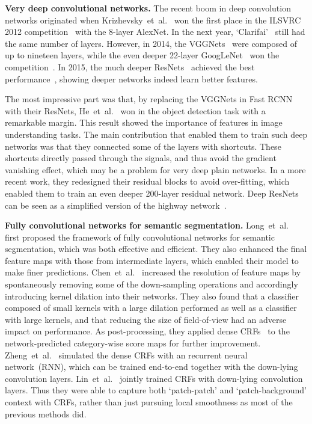 \documentclass{article}
\begin{document}
\textbf{Very deep convolutional networks.}
The recent boom in deep convolution networks originated when Krizhevsky~et~al.~\cite{CNN.NIPS.2012.Krizhevsky} won the first place in the ILSVRC 2012 competition~\cite{ILSVRC2015} with the 8-layer AlexNet.
In the next year, `Clarifai'~\cite{ILSVRC2015} still had the same number of layers.
However, in 2014, the VGGNets~\cite{VGGNet.2014.Simonyan} were composed of up to nineteen layers,
while the even deeper 22-layer GoogLeNet~\cite{GoogLeNet.2014.Szegedy} won the competition~\cite{ILSVRC2015}.
In 2015, the much deeper ResNets~\cite{ResNet.CVPR.2016.He} achieved the best performance~\cite{ILSVRC2015},
showing deeper networks indeed learn better features.

The most impressive part was that, by replacing the VGGNets in Fast RCNN~\cite{FastRCNN.ICCV.2015.Girshick} with their ResNets, He~et~al.~\cite{ResNet.CVPR.2016.He} won in the object detection task with a remarkable margin.
This result showed the importance of features in image understanding tasks.
The main contribution that enabled them to
train such deep networks was that they connected some of the layers with shortcuts.
These shortcuts directly passed through the signals,
and thus avoid the gradient vanishing effect,
which may be a problem for very deep plain networks.
In a more recent work, they redesigned their residual blocks to avoid over-fitting,
which enabled them to train an even deeper 200-layer residual network.
Deep ResNets can be seen as a simplified version of the highway network~\cite{Highway}.



\textbf{Fully convolutional networks for semantic segmentation.}
Long~et~al.~\cite{FCN.CVPR.2015.Long} first proposed the framework of fully convolutional networks for semantic segmentation, which was both effective and efficient.
They also enhanced the final feature maps with those from intermediate layers, which enabled their model to make finer predictions.
Chen~et~al.~\cite{DeepLab.ICLR.2015.Chen} increased the resolution of feature maps by spontaneously
removing some of the down-sampling operations and accordingly introducing kernel dilation into their networks.
They also found that a classifier composed of small kernels with a large dilation performed as well as a classifier
with large kernels, and that reducing the size of field-of-view had an adverse impact on performance.
As post-processing, they applied dense CRFs~\cite{DenseCRF.NIPS.2011.Krahenbuhl} to the network-predicted category-wise score maps for further improvement.
Zheng~et~al.~\cite{CRFasRNN.ICCV.2015.Zheng} simulated the dense CRFs with an
recurrent neural network~(RNN), which can be trained end-to-end together with the down-lying convolution layers.
Lin~et~al.~\cite{AdelaideContext.2016.Lin} jointly trained CRFs with down-lying convolution layers.
Thus they were able to capture both `patch-patch' and `patch-background'
context with CRFs, rather than just pursuing local smoothness as most of the previous methods did.
\end{document}
